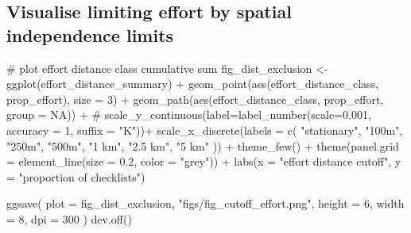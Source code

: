 \documentclass[]{article}
\newenvironment{Shaded}{}{}
\newcommand{\CommentTok}[1]{\textcolor[rgb]{0.00,0.50,0.00}{#1}}
\newcommand{\DataTypeTok}[1]{#1}
\newcommand{\DecValTok}[1]{#1}
\newcommand{\FloatTok}[1]{#1}
\newcommand{\KeywordTok}[1]{\textcolor[rgb]{0.00,0.00,1.00}{#1}}
\newcommand{\NormalTok}[1]{#1}
\newcommand{\OperatorTok}[1]{#1}
\newcommand{\OtherTok}[1]{\textcolor[rgb]{1.00,0.25,0.00}{#1}}
\newcommand{\StringTok}[1]{\textcolor[rgb]{0.00,0.50,0.50}{#1}}
\begin{document}
\hypertarget{visualise-limiting-effort-by-spatial-independence-limits}{%
\subsection{Visualise limiting effort by spatial independence limits}\label{visualise-limiting-effort-by-spatial-independence-limits}}

\begin{Shaded}
\begin{Highlighting}[numbers=left,,]
\CommentTok{# plot effort distance class cumulative sum}
\NormalTok{fig_dist_exclusion <-}\StringTok{ }\KeywordTok{ggplot}\NormalTok{(effort_distance_summary) }\OperatorTok{+}
\StringTok{  }\KeywordTok{geom_point}\NormalTok{(}\KeywordTok{aes}\NormalTok{(effort_distance_class, prop_effort), }\DataTypeTok{size =} \DecValTok{3}\NormalTok{) }\OperatorTok{+}
\StringTok{  }\KeywordTok{geom_path}\NormalTok{(}\KeywordTok{aes}\NormalTok{(effort_distance_class, prop_effort, }\DataTypeTok{group =} \OtherTok{NA}\NormalTok{)) }\OperatorTok{+}
\StringTok{  }\CommentTok{# scale_y_continuous(label=label_number(scale=0.001, accuracy = 1, suffix = "K"))+}
\StringTok{  }\KeywordTok{scale_x_discrete}\NormalTok{(}\DataTypeTok{labels =} \KeywordTok{c}\NormalTok{(}
    \StringTok{"stationary"}\NormalTok{, }\StringTok{"100m"}\NormalTok{, }\StringTok{"250m"}\NormalTok{,}
    \StringTok{"500m"}\NormalTok{, }\StringTok{"1 km"}\NormalTok{, }\StringTok{"2.5 km"}\NormalTok{, }\StringTok{"5 km"}
\NormalTok{  )) }\OperatorTok{+}
\StringTok{  }\KeywordTok{theme_few}\NormalTok{() }\OperatorTok{+}
\StringTok{  }\KeywordTok{theme}\NormalTok{(}\DataTypeTok{panel.grid =} \KeywordTok{element_line}\NormalTok{(}\DataTypeTok{size =} \FloatTok{0.2}\NormalTok{, }\DataTypeTok{color =} \StringTok{"grey"}\NormalTok{)) }\OperatorTok{+}
\StringTok{  }\KeywordTok{labs}\NormalTok{(}\DataTypeTok{x =} \StringTok{"effort distance cutoff"}\NormalTok{, }\DataTypeTok{y =} \StringTok{"proportion of checklists"}\NormalTok{)}

\KeywordTok{ggsave}\NormalTok{(}
  \DataTypeTok{plot =}\NormalTok{ fig_dist_exclusion, }\StringTok{"figs/fig_cutoff_effort.png"}\NormalTok{,}
  \DataTypeTok{height =} \DecValTok{6}\NormalTok{, }\DataTypeTok{width =} \DecValTok{8}\NormalTok{, }\DataTypeTok{dpi =} \DecValTok{300}
\NormalTok{)}
\KeywordTok{dev.off}\NormalTok{()}
\end{Highlighting}
\end{Shaded}
\end{document}
